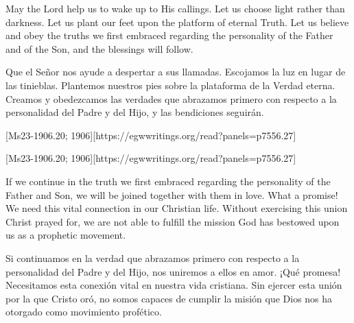 May the Lord help us to wake up to His callings. Let us choose light rather than darkness. Let us plant our feet upon the platform of eternal Truth. Let us believe and obey the truths we first embraced regarding the personality of the Father and of the Son, and the blessings will follow.


Que el Señor nos ayude a despertar a sus llamadas. Escojamos la luz en lugar de las tinieblas. Plantemos nuestros pies sobre la plataforma de la Verdad eterna. Creamos y obedezcamos las verdades que abrazamos primero con respecto a la personalidad del Padre y del Hijo, y las bendiciones seguirán.


[Ms23-1906.20; 1906][https://egwwritings.org/read?panels=p7556.27]


[Ms23-1906.20; 1906][https://egwwritings.org/read?panels=p7556.27]


If we continue in the truth we first embraced regarding the personality of the Father and Son, we will be joined together with them in love. What a promise! We need this vital connection in our Christian life. Without exercising this union Christ prayed for, we are not able to fulfill the mission God has bestowed upon us as a prophetic movement.


Si continuamos en la verdad que abrazamos primero con respecto a la personalidad del Padre y del Hijo, nos uniremos a ellos en amor. ¡Qué promesa! Necesitamos esta conexión vital en nuestra vida cristiana. Sin ejercer esta unión por la que Cristo oró, no somos capaces de cumplir la misión que Dios nos ha otorgado como movimiento profético.


